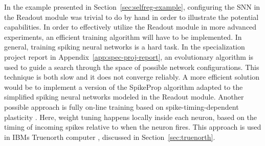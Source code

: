 In the example presented in Section~\ref{sec:selfreg-example}, configuring the
SNN in the Readout module was trivial to do by hand in order to illustrate the
potential capabilities. In order to effectively utilize the Readout module in
more advanced experiments, an efficient training algorithm will have to be
implemented. In general, training spiking neural networks is a hard task. In the
specialization project report in Appendix~\ref{app:spec-proj-report}, an
evolutionary algorithm is used to guide a search through the space of possible
network configurations. This technique is both slow and it does not converge
reliably. A more efficient solution would be to implement a version of the
SpikeProp algorithm \cite{Bohte2002} adapted to the simplified spiking neural
networks modeled in the Readout module. Another possible approach is fully
on-line training based on spike-timing-dependent plasticity \cite{Markram2012}.
Here, weight tuning happens locally inside each neuron, based on the timing of
incoming spikes relative to when the neuron fires. This approach is used in IBMs
Truenorth computer \cite{6055293}, discussed in Section~\ref{sec:truenorth}.

\cleardoublepage

